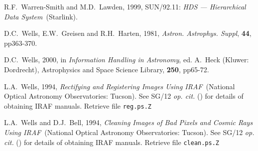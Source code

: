 \documentclass[twoside,11pt]{article}
\newcommand{\xref}[3]{#1}
\begin{document}
\begin{thebibliography}{99}
   R.F.~Warren-Smith and M.D.~Lawden, 1999,
   \xref{SUN/92.11}{sun92}{}: {\it HDS --- Hierarchical Data System}\,
   (Starlink).

   D.C.~Wells, E.W.~Greisen and R.H.~Harten, 1981,
   {\it Astron. Astrophys. Suppl}, {\bf 44}, pp363-370.

   D.C.~Wells, 2000, in {\it Information Handling in
   Astronomy}, ed. A.~Heck (Kluwer: Dordrecht), Astrophysics and Space
   Science Library, {\bf 250}, pp65-72.

   L.A.~Wells, 1994, {\it Rectifying and Registering
   Images Using IRAF}\, (National Optical Astronomy Observatories: Tucson).
   See \xref{SG/12}{sg12}{} {\it op. cit.}\/ (\cite{SG12}) for details of
   obtaining IRAF manuals.  Retrieve file {\tt reg.ps.Z}

   L.A.~Wells and D.J.~Bell, 1994, {\it Cleaning
   Images of Bad Pixels and Cosmic Rays Using IRAF}\, (National Optical
   Astronomy Observatories: Tucson).  See \xref{SG/12}{sg12}{} {\it op.
   cit.}\/ (\cite{SG12}) for details of obtaining IRAF manuals.  Retrieve
   file {\tt clean.ps.Z}

\end{thebibliography}


\typeout{  }
\typeout{*****************************************************}
\typeout{  }
\typeout{  }
\typeout{*****************************************************}
\typeout{  }
\end{document}
